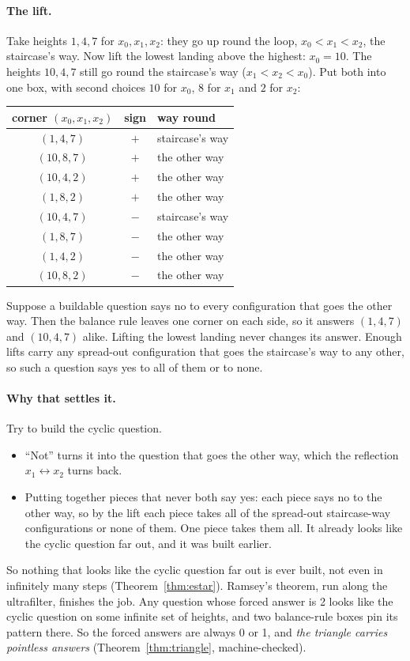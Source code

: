 \documentclass[11pt]{article}
\theoremstyle{plain}
\theoremstyle{definition}
\begin{document}
\paragraph{The lift.} Take heights $1,4,7$ for $x_0,x_1,x_2$: they go up round
the loop, $x_0<x_1<x_2$, the staircase's way. Now lift the lowest landing above
the highest: $x_0=10$. The heights $10,4,7$ still go round the staircase's way
($x_1<x_2<x_0$). Put both into one box, with second choices $10$ for $x_0$, $8$
for $x_1$ and $2$ for $x_2$:
\begin{center}\small
\begin{tabular}{c c l}
\textbf{corner} $(x_0,x_1,x_2)$ & \textbf{sign} & \textbf{way round}\\\hline
$(1,4,7)$ & $+$ & staircase's way\\
$(10,8,7)$ & $+$ & the other way\\
$(10,4,2)$ & $+$ & the other way\\
$(1,8,2)$ & $+$ & the other way\\\hline
$(10,4,7)$ & $-$ & staircase's way\\
$(1,8,7)$ & $-$ & the other way\\
$(1,4,2)$ & $-$ & the other way\\
$(10,8,2)$ & $-$ & the other way\\
\end{tabular}
\end{center}
Suppose a buildable question says no to every configuration that goes the other
way. Then the balance rule leaves one corner on each side, so it answers
$(1,4,7)$ and $(10,4,7)$ alike. Lifting the lowest landing never changes its
answer. Enough lifts carry any spread-out configuration that goes the
staircase's way to any other, so such a question says yes to all of them or to
none.

\paragraph{Why that settles it.} Try to build the cyclic question.
\begin{itemize}[nosep]
  \item ``Not'' turns it into the question that goes the other way, which the
    reflection $x_1\leftrightarrow x_2$ turns back.
  \item Putting together pieces that never both say yes: each piece says no to
    the other way, so by the lift each piece takes all of the spread-out
    staircase-way configurations or none of them. One piece takes them all.
    It already looks like the cyclic question far out, and it was built
    earlier.
\end{itemize}
So nothing that looks like the cyclic question far out is ever built, not even
in infinitely many steps (Theorem~\ref{thm:estar}). Ramsey's theorem, run
along the ultrafilter, finishes the job. Any question whose forced answer is 2
looks like the cyclic question on some infinite set of heights, and two
balance-rule boxes pin its pattern there. So the forced answers are always 0 or
1, and \emph{the triangle carries pointless answers}
(Theorem~\ref{thm:triangle}, machine-checked).
\end{document}
